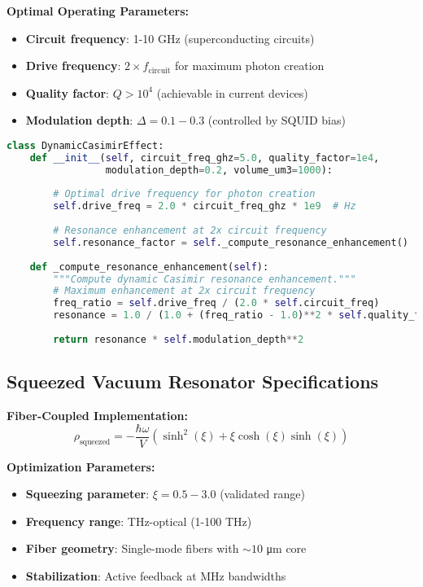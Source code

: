 \documentclass[11pt]{article}
\begin{document}
\textbf{Optimal Operating Parameters:}
\begin{itemize}
    \item \textbf{Circuit frequency}: 1-10 GHz (superconducting circuits)
    \item \textbf{Drive frequency}: $2 \times f_{\text{circuit}}$ for maximum photon creation
    \item \textbf{Quality factor}: $Q > 10^4$ (achievable in current devices)
    \item \textbf{Modulation depth}: $\Delta = 0.1-0.3$ (controlled by SQUID bias)
\end{itemize}

\begin{lstlisting}[language=Python]
class DynamicCasimirEffect:
    def __init__(self, circuit_freq_ghz=5.0, quality_factor=1e4,
                 modulation_depth=0.2, volume_um3=1000):
        
        # Optimal drive frequency for photon creation
        self.drive_freq = 2.0 * circuit_freq_ghz * 1e9  # Hz
        
        # Resonance enhancement at 2x circuit frequency
        self.resonance_factor = self._compute_resonance_enhancement()
        
    def _compute_resonance_enhancement(self):
        """Compute dynamic Casimir resonance enhancement."""
        # Maximum enhancement at 2x circuit frequency
        freq_ratio = self.drive_freq / (2.0 * self.circuit_freq)
        resonance = 1.0 / (1.0 + (freq_ratio - 1.0)**2 * self.quality_factor)
        
        return resonance * self.modulation_depth**2
\end{lstlisting}

\subsection{Squeezed Vacuum Resonator Specifications}

\textbf{Fiber-Coupled Implementation:}
\begin{equation}
\rho_{\text{squeezed}} = -\frac{\hbar \omega}{V} (\sinh^2(\xi) + \xi \cosh(\xi)\sinh(\xi))
\end{equation}

\textbf{Optimization Parameters:}
\begin{itemize}
    \item \textbf{Squeezing parameter}: $\xi = 0.5-3.0$ (validated range)
    \item \textbf{Frequency range}: THz-optical (1-100 THz)
    \item \textbf{Fiber geometry}: Single-mode fibers with $\sim 10$ μm core
    \item \textbf{Stabilization}: Active feedback at MHz bandwidths
\end{itemize}
\end{document}

